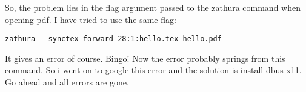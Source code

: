 So, the problem lies in the flag argument passed to the zathura command
when opening pdf. I have tried to use the same flag:

\begin{verbatim}
zathura --synctex-forward 28:1:hello.tex hello.pdf
\end{verbatim}

It gives an error of course. Bingo! Now the error probably springs from
this command. So i went on to google this error and the solution is
install dbus-x11. Go ahead and all errors are gone.
